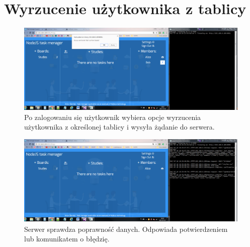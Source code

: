 \documentclass[12pt]{report}
\begin{document}
\section{Wyrzucenie użytkownika z tablicy}
\begin{figure}[!hb]
\centering
\includegraphics[width=\textwidth,height=\textheight,keepaspectratio]{91.png}
\captionsetup{labelformat=empty}
\caption[]{Po zalogowaniu się użytkownik wybiera opcje wyrzucenia użytkownika z określonej tablicy i wysyła żądanie do serwera.}
\end{figure}
\begin{figure}[!hb]
\centering
\includegraphics[width=\textwidth,height=\textheight,keepaspectratio]{92.png}
\captionsetup{labelformat=empty}
\caption[]{Serwer sprawdza poprawność danych. Odpowiada potwierdzeniem lub komunikatem o błędzię.}
\end{figure}
\end{document}
